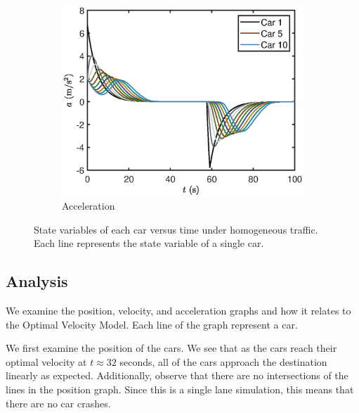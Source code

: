 \documentclass[12pt]{article}
\begin{document}
\begin{figure}[H]
        \begin{subfigure}[H]{0.49\textwidth}
          \includegraphics[width=\linewidth]{HomogeneousTraffic3.eps}
          \centering
          \caption{Acceleration}
        \end{subfigure}
        \caption{State variables of each car versus time under homogeneous traffic. Each line represents the state variable of a single car.} \label{homogeneous_results}
      \end{figure}

      
      \subsection{Analysis}\label{sec:homogeneous_analysis}
      We examine the position, velocity, and acceleration graphs and how it relates to the Optimal Velocity Model. Each line of the graph represent a car. 
      
      We first examine the position of the cars. We see that as the cars reach their optimal velocity at $t \approx 32$ seconds, all of the cars approach the destination linearly as expected. Additionally, observe that there are no intersections of the lines in the position graph. Since this is a single lane simulation, this means that there are no car crashes. 
\end{document}
